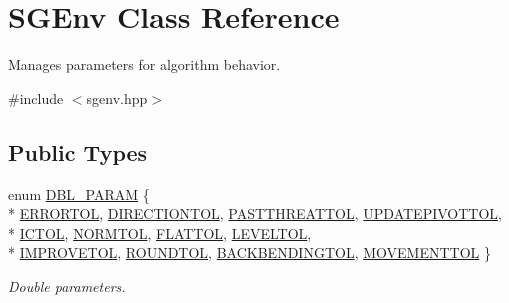 \hypertarget{classSGEnv}{\section{S\-G\-Env Class Reference}
\label{classSGEnv}
}


Manages parameters for algorithm behavior.  




{\ttfamily \#include $<$sgenv.\-hpp$>$}

\subsection*{Public Types}
\begin{DoxyCompactItemize}
\item 
enum \hyperlink{classSGEnv_add4d052ff3e3d09a2113e0ebd032eba3}{D\-B\-L\-\_\-\-P\-A\-R\-A\-M} \{ \\*
\hyperlink{classSGEnv_add4d052ff3e3d09a2113e0ebd032eba3a24f2422ce7913e83db351a70f25bc993}{E\-R\-R\-O\-R\-T\-O\-L}, 
\hyperlink{classSGEnv_add4d052ff3e3d09a2113e0ebd032eba3a24c457dc76c36ab3523595cebeebe37c}{D\-I\-R\-E\-C\-T\-I\-O\-N\-T\-O\-L}, 
\hyperlink{classSGEnv_add4d052ff3e3d09a2113e0ebd032eba3ae5078e3312adc27f56750570940bbc2a}{P\-A\-S\-T\-T\-H\-R\-E\-A\-T\-T\-O\-L}, 
\hyperlink{classSGEnv_add4d052ff3e3d09a2113e0ebd032eba3a57988c88be8abe2e0f5a70c24a0c6058}{U\-P\-D\-A\-T\-E\-P\-I\-V\-O\-T\-T\-O\-L}, 
\\*
\hyperlink{classSGEnv_add4d052ff3e3d09a2113e0ebd032eba3aa1c390ff8d73828cd7ec8a60a312506c}{I\-C\-T\-O\-L}, 
\hyperlink{classSGEnv_add4d052ff3e3d09a2113e0ebd032eba3a4390f0db805b9e706748080ff7f5afa5}{N\-O\-R\-M\-T\-O\-L}, 
\hyperlink{classSGEnv_add4d052ff3e3d09a2113e0ebd032eba3a2871a0b99d9bc7741c5b58daaf47295c}{F\-L\-A\-T\-T\-O\-L}, 
\hyperlink{classSGEnv_add4d052ff3e3d09a2113e0ebd032eba3abe21f82b18f97c3f82623fbff2d6f7c0}{L\-E\-V\-E\-L\-T\-O\-L}, 
\\*
\hyperlink{classSGEnv_add4d052ff3e3d09a2113e0ebd032eba3a05217430c8bb4ca13c17278e24c1efd5}{I\-M\-P\-R\-O\-V\-E\-T\-O\-L}, 
\hyperlink{classSGEnv_add4d052ff3e3d09a2113e0ebd032eba3ad20bf8db40676f36fbddcfe6aa05b91c}{R\-O\-U\-N\-D\-T\-O\-L}, 
\hyperlink{classSGEnv_add4d052ff3e3d09a2113e0ebd032eba3a4caeac1b7260cff08fa73b92d9df9865}{B\-A\-C\-K\-B\-E\-N\-D\-I\-N\-G\-T\-O\-L}, 
\hyperlink{classSGEnv_add4d052ff3e3d09a2113e0ebd032eba3a2fa0920a362247d81391c06a8538ff99}{M\-O\-V\-E\-M\-E\-N\-T\-T\-O\-L}
 \}
\begin{DoxyCompactList}\small\item\em Double parameters. \end{DoxyCompactList}\item 

\end{DoxyCompactItemize}
